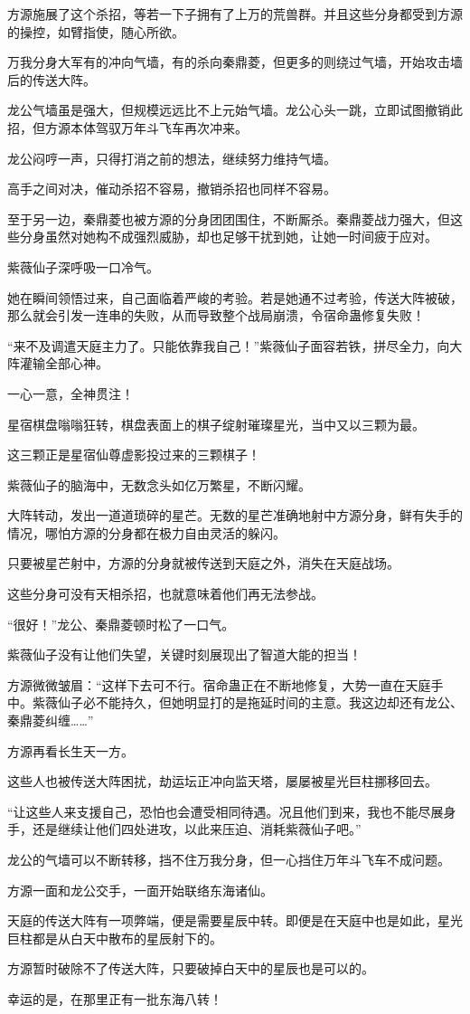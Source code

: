 \begin{this_body}
方源施展了这个杀招，等若一下子拥有了上万的荒兽群。并且这些分身都受到方源的操控，如臂指使，随心所欲。

万我分身大军有的冲向气墙，有的杀向秦鼎菱，但更多的则绕过气墙，开始攻击墙后的传送大阵。

龙公气墙虽是强大，但规模远远比不上元始气墙。龙公心头一跳，立即试图撤销此招，但方源本体驾驭万年斗飞车再次冲来。

龙公闷哼一声，只得打消之前的想法，继续努力维持气墙。

高手之间对决，催动杀招不容易，撤销杀招也同样不容易。

至于另一边，秦鼎菱也被方源的分身团团围住，不断厮杀。秦鼎菱战力强大，但这些分身虽然对她构不成强烈威胁，却也足够干扰到她，让她一时间疲于应对。

紫薇仙子深呼吸一口冷气。

她在瞬间领悟过来，自己面临着严峻的考验。若是她通不过考验，传送大阵被破，那么就会引发一连串的失败，从而导致整个战局崩溃，令宿命蛊修复失败！

“来不及调遣天庭主力了。只能依靠我自己！”紫薇仙子面容若铁，拼尽全力，向大阵灌输全部心神。

一心一意，全神贯注！

星宿棋盘嗡嗡狂转，棋盘表面上的棋子绽射璀璨星光，当中又以三颗为最。

这三颗正是星宿仙尊虚影投过来的三颗棋子！

紫薇仙子的脑海中，无数念头如亿万繁星，不断闪耀。

大阵转动，发出一道道琐碎的星芒。无数的星芒准确地射中方源分身，鲜有失手的情况，哪怕方源的分身都在极力自由灵活的躲闪。

只要被星芒射中，方源的分身就被传送到天庭之外，消失在天庭战场。

这些分身可没有天相杀招，也就意味着他们再无法参战。

“很好！”龙公、秦鼎菱顿时松了一口气。

紫薇仙子没有让他们失望，关键时刻展现出了智道大能的担当！

方源微微皱眉：“这样下去可不行。宿命蛊正在不断地修复，大势一直在天庭手中。紫薇仙子必不能持久，但她明显打的是拖延时间的主意。我这边却还有龙公、秦鼎菱纠缠……”

方源再看长生天一方。

这些人也被传送大阵困扰，劫运坛正冲向监天塔，屡屡被星光巨柱挪移回去。

“让这些人来支援自己，恐怕也会遭受相同待遇。况且他们到来，我也不能尽展身手，还是继续让他们四处进攻，以此来压迫、消耗紫薇仙子吧。”

龙公的气墙可以不断转移，挡不住万我分身，但一心挡住万年斗飞车不成问题。

方源一面和龙公交手，一面开始联络东海诸仙。

天庭的传送大阵有一项弊端，便是需要星辰中转。即便是在天庭中也是如此，星光巨柱都是从白天中散布的星辰射下的。

方源暂时破除不了传送大阵，只要破掉白天中的星辰也是可以的。

幸运的是，在那里正有一批东海八转！

\end{this_body}

